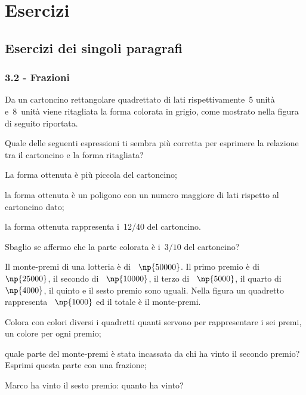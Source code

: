\section{Esercizi}
\subsection{Esercizi dei singoli paragrafi}
\subsubsection*{3.2 - Frazioni}

\begin{esercizio}
\label{ese:3.1}
Da un cartoncino rettangolare quadrettato di lati rispettivamente~5 unità e~8~unità viene ritagliata
la forma colorata in grigio, come mostrato nella figura di seguito riportata.
\begin{center}
 
\end{center}
Quale delle seguenti espressioni ti sembra più corretta per esprimere la relazione tra il
cartoncino e la forma ritagliata?
\begin{enumeratea}
 \item La forma ottenuta è più piccola del cartoncino;
 \item la forma ottenuta è un poligono con un numero maggiore di lati rispetto al cartoncino dato;
 \item la forma ottenuta rappresenta i~12/40 del cartoncino.
\end{enumeratea}
Sbaglio se affermo che la parte colorata è i~$3/10$ del cartoncino?
\end{esercizio}

\begin{esercizio}
\label{ese:3.2}
Il monte-premi di una lotteria è di \officialeuro~$\np{50000}$. Il primo premio è di \officialeuro~$\np{25000}$, il secondo di
\officialeuro~$\np{10000}$, il terzo di \officialeuro~$\np{5000}$, il quarto di \officialeuro~$\np{4000}$, il quinto e il sesto premio sono uguali.
Nella figura un quadretto rappresenta \officialeuro~$\np{1000}$ ed il totale è il monte-premi.
\begin{center}
 
\end{center}
\begin{enumeratea}
 \item Colora con colori diversi i quadretti quanti servono per rappresentare i sei premi, un colore per ogni premio;
 \item quale parte del monte-premi è stata incassata da chi ha vinto il secondo premio?
	Esprimi questa parte con una frazione;
 \item Marco ha vinto il sesto premio: quanto ha vinto?
\end{enumeratea}
\end{esercizio}

